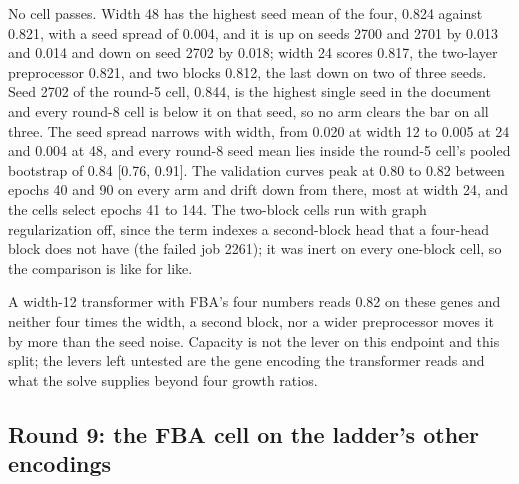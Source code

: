 


No cell passes. Width 48 has the highest seed mean of the four, 0.824 against 0.821,
with a seed spread of 0.004, and it is up on seeds 2700 and 2701 by 0.013 and 0.014 and
down on seed 2702 by 0.018; width 24 scores 0.817, the two-layer preprocessor 0.821, and
two blocks 0.812, the last down on two of three seeds. Seed 2702 of the round-5 cell,
0.844, is the highest single seed in the document and every round-8 cell is below it on
that seed, so no arm clears the bar on all three. The seed spread narrows with width, from
0.020 at width 12 to 0.005 at 24 and 0.004 at 48, and every round-8 seed mean lies inside
the round-5 cell's pooled bootstrap of 0.84 [0.76, 0.91]. The validation curves peak at
0.80 to 0.82 between epochs 40 and 90 on every arm and drift down from there, most at width
24, and the cells select epochs 41 to 144. The two-block cells run with graph
regularization off, since the term indexes a second-block head that a four-head block
does not have (the failed job 2261); it was inert on every one-block cell, so the
comparison is like for like.

A width-12 transformer with FBA's four numbers reads 0.82 on these genes and neither
four times the width, a second block, nor a wider preprocessor moves it by more than the
seed noise. Capacity is not the lever on this endpoint and this split; the levers left
untested are the gene encoding the transformer reads and what the solve supplies beyond
four growth ratios.

\subsection{Round 9: the FBA cell on the ladder's other encodings}

